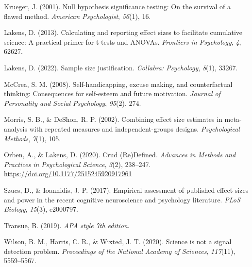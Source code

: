 \documentclass[
  man]{apa7}
\newlength{\cslhangindent}
\newlength{\cslentryspacingunit} %
\newenvironment{CSLReferences}[2] %
 {%
  \setlength{\parindent}{0pt}
  \ifodd #1
  \let\oldpar\par
  \def\par{\hangindent=\cslhangindent\oldpar}
  \fi
  \setlength{\parskip}{#2\cslentryspacingunit}
 }%
 {}
\begin{document}
\begin{CSLReferences}{1}{0}
\leavevmode{}%
Krueger, J. (2001). Null hypothesis significance testing: On the survival of a flawed method. \emph{American Psychologist}, \emph{56}(1), 16.

\leavevmode{}%
Lakens, D. (2013). Calculating and reporting effect sizes to facilitate cumulative science: A practical primer for t-tests and ANOVAs. \emph{Frontiers in Psychology}, \emph{4}, 62627.

\leavevmode{}%
Lakens, D. (2022). Sample size justification. \emph{Collabra: Psychology}, \emph{8}(1), 33267.

\leavevmode{}%
McCrea, S. M. (2008). Self-handicapping, excuse making, and counterfactual thinking: Consequences for self-esteem and future motivation. \emph{Journal of Personality and Social Psychology}, \emph{95}(2), 274.

\leavevmode{}%
Morris, S. B., \& DeShon, R. P. (2002). Combining effect size estimates in meta-analysis with repeated measures and independent-groups designs. \emph{Psychological Methods}, \emph{7}(1), 105.

\leavevmode{}%
Orben, A., \& Lakens, D. (2020). Crud ({Re}){Defined}. \emph{Advances in Methods and Practices in Psychological Science}, \emph{3}(2), 238--247. \url{https://doi.org/10.1177/2515245920917961}

\leavevmode{}%
Szucs, D., \& Ioannidis, J. P. (2017). Empirical assessment of published effect sizes and power in the recent cognitive neuroscience and psychology literature. \emph{PLoS Biology}, \emph{15}(3), e2000797.

\leavevmode{}%
Transue, B. (2019). \emph{APA style 7th edition}.

\leavevmode{}%
Wilson, B. M., Harris, C. R., \& Wixted, J. T. (2020). Science is not a signal detection problem. \emph{Proceedings of the National Academy of Sciences}, \emph{117}(11), 5559--5567.

\end{CSLReferences}
\end{document}
